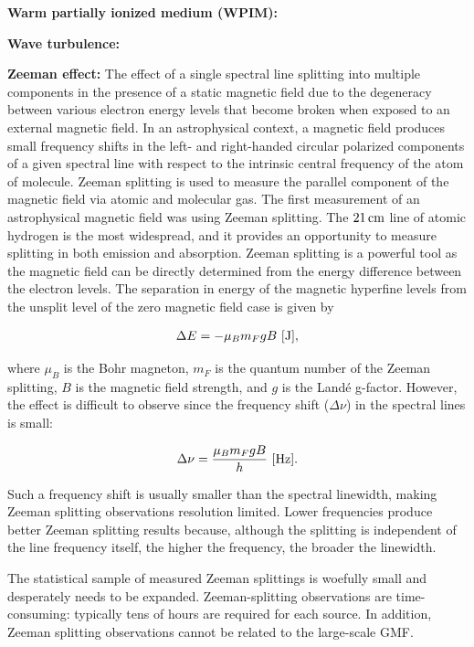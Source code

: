 \documentclass[a4paper,10pt]{article}
\begin{document}
{\noindent}\textbf{Warm partially ionized medium (WPIM):}

{\noindent}\textbf{Wave turbulence:}

{\noindent}\textbf{Zeeman effect:} The effect of a single spectral line splitting into multiple components in the presence of a static magnetic field due to the degeneracy between various electron energy levels that become broken when exposed to an external magnetic field. In an astrophysical context, a magnetic field produces small frequency shifts in the left- and right-handed circular polarized components of a given spectral line with respect to the intrinsic central frequency of the atom of molecule. Zeeman splitting is used to measure the parallel component of the magnetic field via atomic and molecular gas. The first measurement of an astrophysical magnetic field was using Zeeman splitting. The $21\,{\rm cm}$ line of atomic hydrogen is the most widespread, and it provides an opportunity to measure splitting in both emission and absorption. Zeeman splitting is a powerful tool as the magnetic field can be directly determined from the energy difference between the electron levels. The separation in energy of the magnetic hyperfine levels from the unsplit level of the zero magnetic field case is given by

\begin{align*}
    \Delta E = -\mu_Bm_FgB ~ [{\rm J}],
\end{align*}

{\noindent}where $\mu_B$ is the Bohr magneton, $m_F$ is the quantum number of the Zeeman splitting, $B$ is the magnetic field strength, and $g$ is the Land\'e g-factor. However, the effect is difficult to observe since the frequency shift ($\Delta\nu$) in the spectral lines is small:

\begin{align*}
    \Delta\nu = \frac{\mu_Bm_FgB}{h} ~ [{\rm Hz}].
\end{align*}

{\noindent}Such a frequency shift is usually smaller than the spectral linewidth, making Zeeman splitting observations resolution limited. Lower frequencies produce better Zeeman splitting results because, although the splitting is independent of the line frequency itself, the higher the frequency, the broader the linewidth.

{\noindent}The statistical sample of measured Zeeman splittings is woefully small and desperately needs to be expanded. Zeeman-splitting observations are time-consuming: typically tens of hours are required for each source. In addition, Zeeman splitting observations cannot be related to the large-scale GMF.
\end{document}
